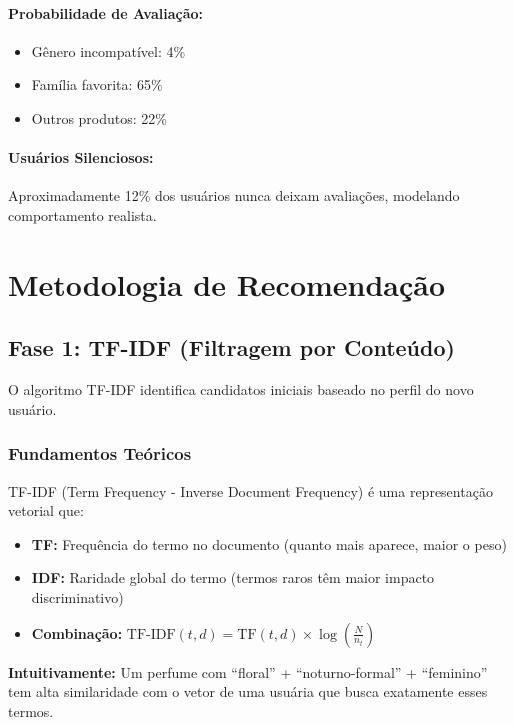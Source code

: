 \documentclass[12pt,a4paper]{article}
\begin{document}
\paragraph{Probabilidade de Avaliação:}
\begin{itemize}
    \item Gênero incompatível: 4\%
    \item Família favorita: 65\%
    \item Outros produtos: 22\%
\end{itemize}

\paragraph{Usuários Silenciosos:}
Aproximadamente 12\% dos usuários nunca deixam avaliações, modelando comportamento realista.

\section{Metodologia de Recomendação}

\subsection{Fase 1: TF-IDF (Filtragem por Conteúdo)}

O algoritmo TF-IDF identifica candidatos iniciais baseado no perfil do novo usuário.

\subsubsection{Fundamentos Teóricos}

TF-IDF (Term Frequency - Inverse Document Frequency) é uma representação vetorial que:

\begin{itemize}
    \item \textbf{TF:} Frequência do termo no documento (quanto mais aparece, maior o peso)
    \item \textbf{IDF:} Raridade global do termo (termos raros têm maior impacto discriminativo)
    \item \textbf{Combinação:} $\text{TF-IDF}(t,d) = \text{TF}(t,d) \times \log\left(\frac{N}{n_t}\right)$
\end{itemize}

\textbf{Intuitivamente:} Um perfume com ``floral'' + ``noturno-formal'' + ``feminino'' tem alta similaridade com o vetor de uma usuária que busca exatamente esses termos.
\end{document}
